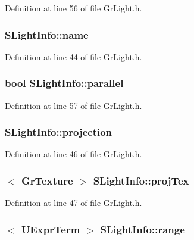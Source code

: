 Definition at line 56 of file GrLight.h.\hypertarget{struct_s_light_info_7af3604ff1142b810497a8c5260e6cfb}{
\subsubsection[{name}]{ {\bf SLightInfo::name}}}
\label{struct_s_light_info_7af3604ff1142b810497a8c5260e6cfb}




Definition at line 44 of file GrLight.h.\hypertarget{struct_s_light_info_ecbb1cd068a1abd41dfdd9b0da62b7c5}{
\subsubsection[{parallel}]{\setlength{\rightskip}{0pt plus 5cm}bool {\bf SLightInfo::parallel}}}
\label{struct_s_light_info_ecbb1cd068a1abd41dfdd9b0da62b7c5}




Definition at line 57 of file GrLight.h.\hypertarget{struct_s_light_info_f22ba7c3f8c8ca55f5da12d61aafb81a}{
\subsubsection[{projection}]{ {\bf SLightInfo::projection}}}
\label{struct_s_light_info_f22ba7c3f8c8ca55f5da12d61aafb81a}




Definition at line 46 of file GrLight.h.\hypertarget{struct_s_light_info_642dfd4d0aa9dd701ace805d95e5449b}{
\subsubsection[{projTex}]{$<$ {\bf GrTexture} $>$ {\bf SLightInfo::projTex}}}
\label{struct_s_light_info_642dfd4d0aa9dd701ace805d95e5449b}




Definition at line 47 of file GrLight.h.\hypertarget{struct_s_light_info_6e6773eee19ee9da44997768f8d77566}{
\subsubsection[{range}]{$<$ {\bf UExprTerm} $>$ {\bf SLightInfo::range}}}
\label{struct_s_light_info_6e6773eee19ee9da44997768f8d77566}




